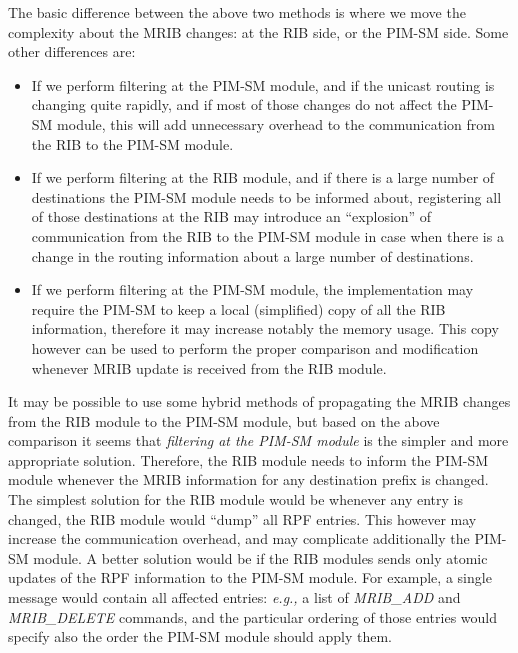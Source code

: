 \documentclass[11pt]{article}
\newcommand{\eg}{\emph{e.g.,}\xspace}
\begin{document}
The basic difference between the above two methods is where we move the
complexity about the MRIB changes: at the RIB side, or the PIM-SM side.
Some other differences are:

\begin{itemize}
  
  \item If we perform filtering at the PIM-SM module, and if the unicast
  routing is changing quite rapidly, and if most of those changes do not
  affect the PIM-SM module, this will add unnecessary overhead to the
  communication from the RIB to the PIM-SM module.
  
  \item If we perform filtering at the RIB module, and if there is a
  large number of destinations the PIM-SM module needs to be informed
  about, registering all of those destinations at the RIB may introduce
  an ``explosion'' of communication from the RIB to the PIM-SM module
  in case when there is a change in the routing information about a
  large number of destinations.
  
  \item If we perform filtering at the PIM-SM module, the implementation
  may require the PIM-SM to keep a local (simplified) copy of all the
  RIB information, therefore it may increase notably the memory usage.
  This copy however can be used to perform the proper comparison and
  modification whenever MRIB update is received from the RIB module.
  
\end{itemize}

It may be possible to use some hybrid methods of propagating the MRIB
changes from the RIB module to the PIM-SM module, but based on the
above comparison it seems that \emph{filtering at the PIM-SM module} is
the simpler and more appropriate solution. Therefore, the RIB module
needs to inform the PIM-SM module whenever the MRIB information for any
destination prefix is changed.  The simplest solution for the RIB
module would be whenever any entry is changed, the RIB module would
``dump'' all RPF entries. This however may increase the communication
overhead, and may complicate additionally the PIM-SM module. A better
solution would be if the RIB modules sends only atomic updates of the
RPF information to the PIM-SM module. For example, a single message
would contain all affected entries: \eg a list of \emph{MRIB\_ADD} and
\emph{MRIB\_DELETE} commands, and the particular ordering of those
entries would specify also the order the PIM-SM module should apply
them.
\end{document}
